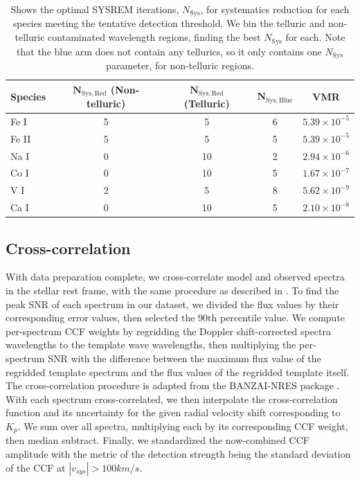 \documentclass[twocolumn]{aastex631}
\begin{document}
    \begin{table}[ht]
        \centering
        \begin{tabular}{lcccc}
            \textbf{Species} & $\textbf{N}_{\mathrm{Sys},\text{Red}}$ (Non-telluric) & $\textbf{N}_{\mathrm{Sys},\text{Red}}$ (Telluric) & $\textbf{N}_{\mathrm{Sys},\text{Blue}}$ & VMR \\
            \hline
            Fe I & 5 & 5 & 6 & $5.39 \times 10^{-5}$ \\        
            Fe II & 5 & 5 & 5 & $5.39 \times 10^{-5}$ \\
            Na I & 0 & 10 & 2 & $2.94 \times 10^{-6}$ \\
            Co I & 0 & 10 & 5 & $1.67 \times 10^{-7}$ \\
            V I & 2 & 5 & 8 & $5.62 \times 10^{-9}$ \\
            Ca I & 0 & 10 & 5 & $2.10 \times 10^{-8}$ \\
        \end{tabular}
        
        \caption{Shows the optimal SYSREM iterations, $N_{\mathrm{Sys}}$, for systematics reduction for each species meeting the tentative detection threshold. We bin the telluric and non-telluric contaminated wavelength regions, finding the best $N_{\mathrm{Sys}}$ for each. Note that the blue arm does not contain any tellurics, so it only contains one $N_{\mathrm{Sys}}$ parameter, for non-telluric regions.}
        
        \label{tab:sysrem_and_vmr}
    \end{table}

    \subsection{Cross-correlation}
        With data preparation complete, we cross-correlate model and observed spectra in the stellar rest frame, with the same procedure as described in \cite{Johnson2023}. To find the peak SNR of each spectrum in our dataset, we divided the flux values by their corresponding error values, then selected the 90th percentile value. We compute per-spectrum CCF weights by regridding the Doppler shift-corrected spectra wavelengths to the template wave wavelengths, then multiplying the per-spectrum SNR with the difference between the maximum flux value of the regridded template spectrum and the flux values of the regridded template itself. The cross-correlation procedure is adapted from the BANZAI-NRES package \citep{McCully2022}. With each spectrum cross-correlated, we then interpolate the cross-correlation function and its uncertainty for the given radial velocity shift corresponding to $K_p$. We sum over all spectra, multiplying each by its corresponding CCF weight, then median subtract. Finally, we standardized the now-combined CCF amplitude with the metric of the detection strength being the standard deviation of the CCF at $|v_{sys}| > 100 km/s$.
        
\end{document}
